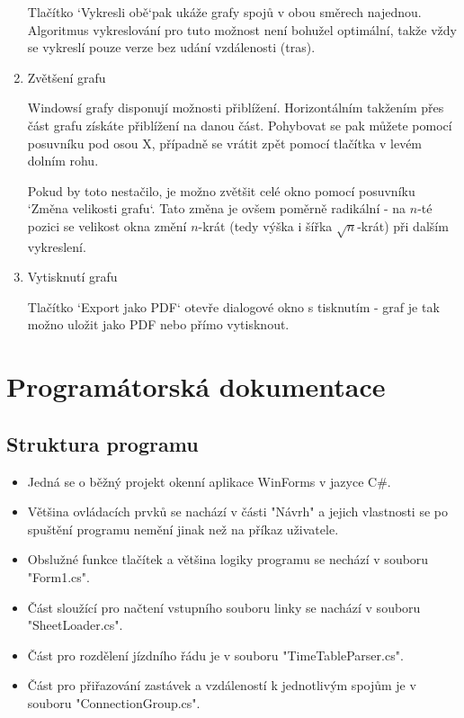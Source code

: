 \documentclass[14pt]{article}
\begin{document}
\begin{enumerate}
Tlačítko `Vykresli obě`pak ukáže grafy spojů v obou směrech najednou. Algoritmus vykreslování pro tuto možnost není bohužel optimální, takže vždy se vykreslí pouze verze bez udání vzdálenosti (tras).

\item Zvětšení grafu

Windowsí grafy disponují možnosti přiblížení. Horizontálním takžením přes část grafu získáte přiblížení na danou část. Pohybovat se pak můžete pomocí posuvníku pod osou X, případně se vrátit zpět pomocí tlačítka v levém dolním rohu.

Pokud by toto nestačilo, je možno zvětšit celé okno pomocí posuvníku `Změna velikosti grafu`. Tato změna je ovšem poměrně radikální - na $n$-té pozici se velikost okna změní $n$-krát (tedy výška i šířka $\sqrt{n}$-krát) při dalším vykreslení.

\item Vytisknutí grafu

Tlačítko `Export jako PDF` otevře dialogové okno s tisknutím - graf je tak možno uložit jako PDF nebo přímo vytisknout.
\end{enumerate}

\section{Programátorská dokumentace}

\subsection{Struktura programu}

\begin{itemize}
\item Jedná se o běžný projekt okenní aplikace WinForms v jazyce C\#. 

\item Většina ovládacích prvků se nachází v části "Návrh" a jejich vlastnosti se po spuštění programu nemění jinak než na příkaz uživatele.

\item Obslužné funkce tlačítek a většina logiky programu se nechází v souboru "Form1.cs".

\item Část sloužící pro načtení vstupního souboru linky se nachází v souboru "SheetLoader.cs".

\item Část pro rozdělení jízdního řádu je v souboru "TimeTableParser.cs".

\item Část pro přiřazování zastávek a vzdáleností k jednotlivým spojům je v souboru "ConnectionGroup.cs".

\end{itemize} 
\end{document}
